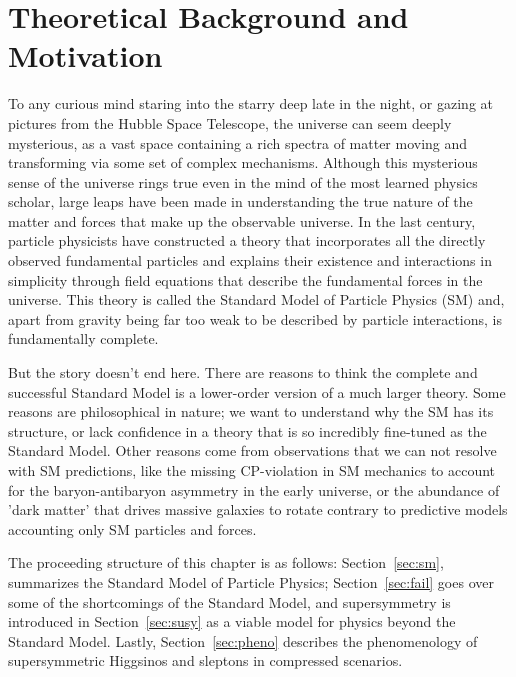 \chapter{Theoretical Background and Motivation}
To any curious mind staring into the starry deep late in the night, or gazing at pictures from the Hubble Space Telescope, the universe can seem deeply mysterious, as a vast space containing a rich spectra of matter moving and transforming via some set of complex mechanisms.  Although this mysterious sense of the universe rings true even in the mind of the most learned physics scholar, large leaps have been made in understanding the true nature of the matter and forces that make up the observable universe.   In the last century, particle physicists have constructed a theory that incorporates all the directly observed fundamental particles and explains their existence and interactions in simplicity through field equations that describe the fundamental forces in the universe.  This theory is called the Standard Model of Particle Physics (SM) and, apart from gravity being far too weak to be described by particle interactions, is fundamentally complete.  

But the story doesn't end here.  There are reasons to think the complete and successful Standard Model is a lower-order version of a much larger theory.  Some reasons are philosophical in nature; we want to understand why the SM has its structure, or lack confidence in a theory that is so incredibly fine-tuned as the Standard Model.  Other reasons come from observations that we can not resolve with SM predictions, like the missing CP-violation in SM mechanics to account for the baryon-antibaryon asymmetry in the early universe, or the abundance of 'dark matter' that drives massive galaxies to rotate contrary to predictive models accounting only SM particles and forces.

The proceeding structure of this chapter is as follows: Section~\ref{sec:sm}, summarizes the Standard Model of Particle Physics; %
Section~\ref{sec:fail} goes over some of the shortcomings of the Standard Model, and supersymmetry is introduced in Section~\ref{sec:susy} as a viable model for physics beyond the Standard Model.  Lastly, Section~\ref{sec:pheno} describes the phenomenology of supersymmetric Higgsinos and sleptons in compressed scenarios.

